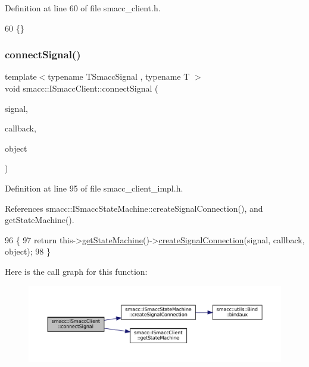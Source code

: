 Definition at line 60 of file smacc\+\_\+client.\+h.


\begin{DoxyCode}
60 \{\}
\end{DoxyCode}
\mbox{\label{classsmacc_1_1ISmaccClient_addce4ebcdebc5a7a3f80c0980862575d}} 
\subsubsection{\texorpdfstring{connect\+Signal()}{connectSignal()}}
{\footnotesize\ttfamily template$<$typename T\+Smacc\+Signal , typename T $>$ \\
void smacc\+::\+I\+Smacc\+Client\+::connect\+Signal (\begin{DoxyParamCaption}\item[{T\+Smacc\+Signal \&}]{signal,  }\item[{void(T\+::$\ast$)()}]{callback,  }\item[{T $\ast$}]{object }\end{DoxyParamCaption})}



Definition at line 95 of file smacc\+\_\+client\+\_\+impl.\+h.



References smacc\+::\+I\+Smacc\+State\+Machine\+::create\+Signal\+Connection(), and get\+State\+Machine().


\begin{DoxyCode}
96 \{
97     \textcolor{keywordflow}{return} this->\hyperlink{classsmacc_1_1ISmaccClient_aec51d4712404cb9882b86e4c854bb93a}{getStateMachine}()->\hyperlink{classsmacc_1_1ISmaccStateMachine_adf0f42ade0c65cc471960fe2a7c42da2}{createSignalConnection}(signal, 
      callback, \textcolor{keywordtype}{object});
98 \}
\end{DoxyCode}
Here is the call graph for this function\+:
\nopagebreak
\begin{figure}[H]
\begin{center}
\leavevmode
\includegraphics[width=350pt]{classsmacc_1_1ISmaccClient_addce4ebcdebc5a7a3f80c0980862575d_cgraph}
\end{center}
\end{figure}
\mbox{\label{classsmacc_1_1ISmaccClient_a5c1c8eb5e91a3b399662a52cb0ca86aa}} 
